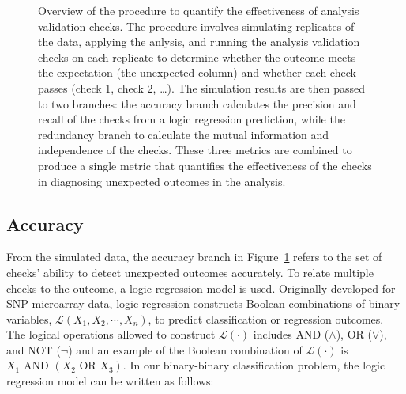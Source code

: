 \documentclass[
  12pt,
]{interact}
\begin{document}
\label{cell-fig-metric-calc}
\begin{figure}[H]


\caption{\label{fig-metric-calc}Overview of the procedure to quantify
the effectiveness of analysis validation checks. The procedure involves
simulating replicates of the data, applying the anlysis, and running the
analysis validation checks on each replicate to determine whether the
outcome meets the expectation (the unexpected column) and whether each
check passes (check 1, check 2, \ldots). The simulation results are then
passed to two branches: the accuracy branch calculates the precision and
recall of the checks from a logic regression prediction, while the
redundancy branch to calculate the mutual information and independence
of the checks. These three metrics are combined to produce a single
metric that quantifies the effectiveness of the checks in diagnosing
unexpected outcomes in the analysis.}

\end{figure}%

\subsection{Accuracy}\label{accuracy}

From the simulated data, the accuracy branch in
Figure~\ref{fig-metric-calc} refers to the set of checks' ability to
detect unexpected outcomes accurately. To relate multiple checks to the
outcome, a logic regression model \citep{ruczinski_logic_2003} is used.
Originally developed for SNP microarray data, logic regression
constructs Boolean combinations of binary variables,
\(\mathcal{L}(X_1, X_2, \cdots, X_n)\), to predict classification or
regression outcomes. The logical operations allowed to construct
\(\mathcal{L(\cdot)}\) includes AND (\(\land\)), OR (\(\lor\)), and NOT
(\(\neg\)) and an example of the Boolean combination of
\(\mathcal{L(\cdot)}\) is \(X_1 \text{ AND } (X_2 \text{ OR } X_3)\). In
our binary-binary classification problem, the logic regression model can
be written as follows:
\end{document}
